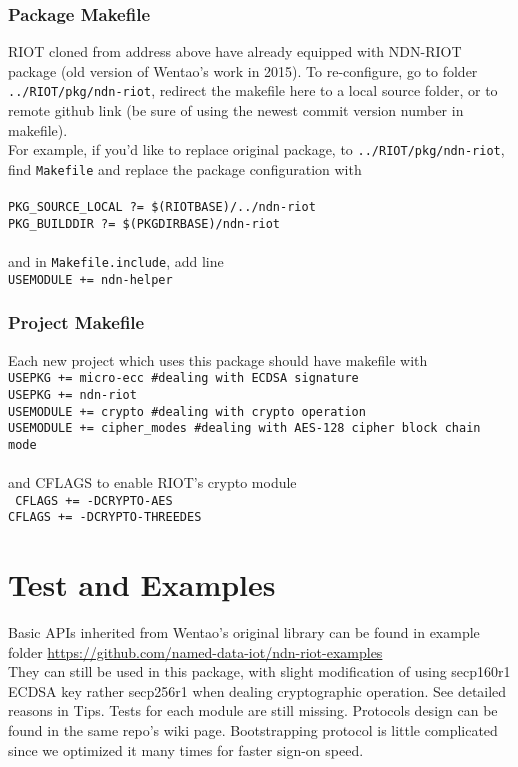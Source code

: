 \documentclass[a4paper, 11pt]{article}
\begin{document}
        \subsubsection*{Package Makefile}
        RIOT cloned from address above have already equipped with NDN-RIOT package (old version of Wentao's work in 2015). To re-configure, go to folder \texttt{../RIOT/pkg/ndn-riot}, redirect the makefile here to a local source folder, or to remote github link (be sure of using the newest commit version number in makefile).\\
        For example, if you'd like to replace original package, to \texttt{../RIOT/pkg/ndn-riot}, find \texttt{Makefile} and replace the package configuration with \\ \\
        \texttt{PKG\_SOURCE\_LOCAL ?= \$(RIOTBASE)/../ndn-riot \\
                PKG\_BUILDDIR ?= \$(PKGDIRBASE)/ndn-riot} \\ \\
        and in \texttt{Makefile.include}, add line \\
        \texttt{USEMODULE += ndn-helper}

        \subsubsection*{Project Makefile}
        Each new project which uses this package should have makefile with \\
        \texttt{USEPKG += micro-ecc \hfill \#dealing with ECDSA signature\\
                USEPKG += ndn-riot  \\
                USEMODULE += crypto \hfill \#dealing with crypto operation\\
                USEMODULE += cipher\_modes \hfill \#dealing with AES-128 cipher block chain mode}\\ \\
        and CFLAGS to enable RIOT's crypto module \\
        \texttt{
                CFLAGS += -DCRYPTO-AES \\
                CFLAGS += -DCRYPTO-THREEDES} \\
    
        \section*{Test and Examples}
        Basic APIs inherited from Wentao's original library can be found in example folder \url{https://github.com/named-data-iot/ndn-riot-examples}\\ They can still be used in this package, with slight modification of using secp160r1 ECDSA key rather secp256r1 when dealing cryptographic operation. See detailed reasons in Tips. Tests for each module are still missing. Protocols design can be found in the same repo's wiki page. Bootstrapping protocol is little complicated since we optimized it many times for faster sign-on speed. 
 
\end{document}
